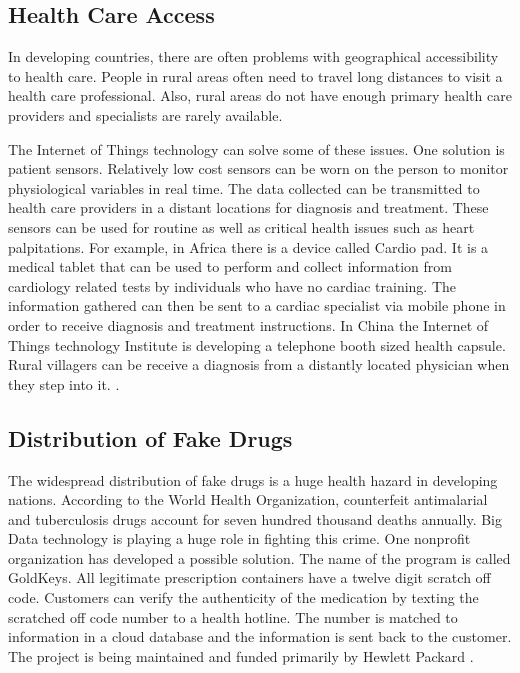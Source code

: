 \documentclass[sigconf]{acmart}
\begin{document}
\subsection{Health Care Access}
In developing countries, there are often problems with geographical accessibility to health care. People in rural areas often need to travel long distances to visit a health care professional. Also, rural areas do not have enough primary health care providers and specialists are rarely available. 

The Internet of Things technology can solve some of these issues. One solution is patient sensors. Relatively low cost sensors can be worn on the person to monitor physiological variables in real time.  The data collected can be transmitted to health care providers in a distant locations for diagnosis and treatment. These sensors can be used for routine as well as critical health issues such as heart palpitations. For example, in Africa there is a device called Cardio pad. It is a medical tablet that can be used to perform and collect information from cardiology related tests by individuals who have no cardiac training. The information gathered can then be sent to a cardiac specialist via mobile phone in order to receive diagnosis and treatment instructions\cite{DevEcon}. In China the Internet of Things technology Institute is developing a telephone booth sized health capsule. Rural villagers can be receive a diagnosis from a distantly located physician when they step into it. \cite{DevEcon}. 

\subsection{Distribution of Fake Drugs}
The widespread distribution of fake drugs is a huge health hazard in developing nations. According to the World Health Organization, counterfeit antimalarial and tuberculosis drugs account for seven hundred thousand deaths annually. Big Data technology is playing a huge role in fighting this crime.  One nonprofit organization has developed a possible solution. The name of the program is called GoldKeys. All legitimate prescription containers have a twelve digit scratch off code. Customers can verify the authenticity of the medication by texting the scratched off code number to a health hotline.  The number is matched to information in a cloud database and the information is sent back to the customer. The project is being maintained and funded primarily by Hewlett Packard \cite{DevEcon}. 
\end{document}
